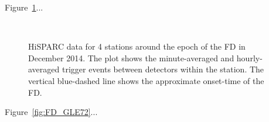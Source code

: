 Figure~\ref{fig:FD_201412}...

\begin{figure}[ht]
	\centering
	 \\
	
	\qquad
	
	
	\caption{HiSPARC data for 4 stations around the epoch of the FD in December 2014. The plot shows the minute-averaged and hourly-averaged trigger events between detectors within the station. The vertical blue-dashed line shows the approximate onset-time of the FD.}
	\label{fig:FD_201412}
\end{figure}



Figure~\ref{fig:FD_GLE72}...

